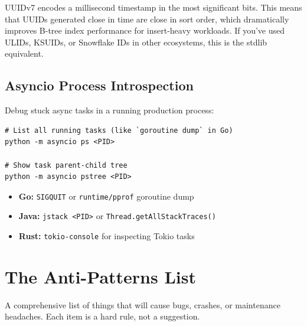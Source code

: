 \documentclass[11pt,a4paper,oneside]{book}
\begin{document}
\begin{infobox}
UUIDv7 encodes a millisecond timestamp in the most significant bits. This means that
UUIDs generated close in time are close in sort order, which dramatically improves B-tree
index performance for insert-heavy workloads. If you've used ULIDs, KSUIDs, or Snowflake IDs
in other ecosystems, this is the stdlib equivalent.
\end{infobox}

\section{Asyncio Process Introspection}

Debug stuck async tasks in a running production process:

\begin{lstlisting}[style=shell]
# List all running tasks (like `goroutine dump` in Go)
python -m asyncio ps <PID>

# Show task parent-child tree
python -m asyncio pstree <PID>
\end{lstlisting}

\begin{analogybox}
\begin{itemize}
    \item \textcolor{goblue}{\textbf{Go:}} \texttt{SIGQUIT} or \texttt{runtime/pprof} goroutine dump
    \item \textcolor{javaorange}{\textbf{Java:}} \texttt{jstack <PID>} or \texttt{Thread.getAllStackTraces()}
    \item \textcolor{BrickRed}{\textbf{Rust:}} \texttt{tokio-console} for inspecting Tokio tasks
\end{itemize}
\end{analogybox}

\chapter{The Anti-Patterns List}

A comprehensive list of things that will cause bugs, crashes, or maintenance headaches.
Each item is a hard rule, not a suggestion.

\vspace{12pt}
\end{document}
